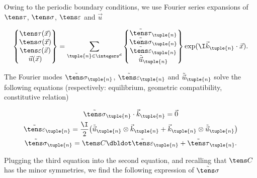 \documentclass[oneside]{memoir}
\begin{document}


Owing to the periodic boundary conditions, we use Fourier series expansions of \(\tens\tau\), \(\tens\sigma\), \(\tens\varepsilon\) and \(\vec u\)



\begin{equation*}
\begin{split}\begin{Bmatrix}
\tens\tau(\vec x)\\
\tens\sigma(\vec x)\\
\tens\varepsilon(\vec x)\\
\vec u(\vec x)
\end{Bmatrix}
=\sum_{\tuple{n}\in\integers^d}
\begin{Bmatrix}
\tilde{\tens\tau}_\tuple{n}\\
\tilde{\tens\sigma}_\tuple{n}\\
\tilde{\tens\varepsilon}_\tuple{n}\\
\tilde{\vec u}_\tuple{n}
\end{Bmatrix}
\exp(\I \vec k_\tuple{n}\cdot\vec x).\end{split}\end{equation*}


The Fourier modes \(\tilde{\tens\sigma}_\tuple{n}\), \(\tilde{\tens\varepsilon}_\tuple{n}\) and \(\tilde{\vec u}_\tuple{n}\) solve the following equations (respectively: equilibrium, geometric compatibility, constitutive relation)



\begin{equation*}
\begin{split}\begin{gathered}
\tilde{\tens\sigma}_\tuple{n}\cdot\vec k_\tuple{n}=\vec 0\\
\tilde{\tens\varepsilon}_\tuple{n}
=\frac{\I}{2}\bigl(\tilde{\vec u}_\tuple{n}\otimes\vec k_\tuple{n}
+\vec k_\tuple{n}\otimes\tilde{\vec u}_\tuple{n}\bigr)\\
\tilde{\tens\sigma}_\tuple{n}=\tens C\dbldot\tilde{\tens\varepsilon}_\tuple{n}
+\tilde{\tens\tau}_\tuple{n}.
\end{gathered}\end{split}\end{equation*}


Plugging the third equation into the second equation, and recalling that \(\tens C\) has the minor symmetries, we find the following expression of \(\tilde{\tens\sigma}\)
\end{document}
